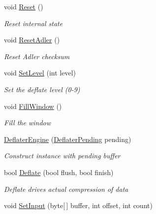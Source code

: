 \begin{DoxyCompactItemize}
void \hyperlink{class_i_c_sharp_code_1_1_sharp_zip_lib_1_1_zip_1_1_compression_1_1_deflater_engine_a6a660bc5902d906ff1b46ec497b2aac3}{Reset} ()
\begin{DoxyCompactList}\small\item\em Reset internal state \end{DoxyCompactList}\item 
void \hyperlink{class_i_c_sharp_code_1_1_sharp_zip_lib_1_1_zip_1_1_compression_1_1_deflater_engine_a46504a258a9d80e4f1854525569d954b}{Reset\+Adler} ()
\begin{DoxyCompactList}\small\item\em Reset Adler checksum \end{DoxyCompactList}\item 
void \hyperlink{class_i_c_sharp_code_1_1_sharp_zip_lib_1_1_zip_1_1_compression_1_1_deflater_engine_a957ec62f92fd20c1cbd9e2fb007a2334}{Set\+Level} (int level)
\begin{DoxyCompactList}\small\item\em Set the deflate level (0-\/9) \end{DoxyCompactList}\item 
void \hyperlink{class_i_c_sharp_code_1_1_sharp_zip_lib_1_1_zip_1_1_compression_1_1_deflater_engine_afc2a7ef56411f0d02e2d242ffa205319}{Fill\+Window} ()
\begin{DoxyCompactList}\small\item\em Fill the window \end{DoxyCompactList}\item 
\hyperlink{class_i_c_sharp_code_1_1_sharp_zip_lib_1_1_zip_1_1_compression_1_1_deflater_engine_a022360f0f70743711abb790677efdcc0}{Deflater\+Engine} (\hyperlink{class_i_c_sharp_code_1_1_sharp_zip_lib_1_1_zip_1_1_compression_1_1_deflater_pending}{Deflater\+Pending} pending)
\begin{DoxyCompactList}\small\item\em Construct instance with pending buffer \end{DoxyCompactList}\item 
bool \hyperlink{class_i_c_sharp_code_1_1_sharp_zip_lib_1_1_zip_1_1_compression_1_1_deflater_engine_a7f0e92fbf6e49d5fc251993e13b08d20}{Deflate} (bool flush, bool finish)
\begin{DoxyCompactList}\small\item\em Deflate drives actual compression of data \end{DoxyCompactList}\item 
void \hyperlink{class_i_c_sharp_code_1_1_sharp_zip_lib_1_1_zip_1_1_compression_1_1_deflater_engine_ab1fe3a452efc5e02b8ef7ff799d68fdf}{Set\+Input} (byte\mbox{[}$\,$\mbox{]} buffer, int offset, int count)

\end{DoxyCompactItemize}
